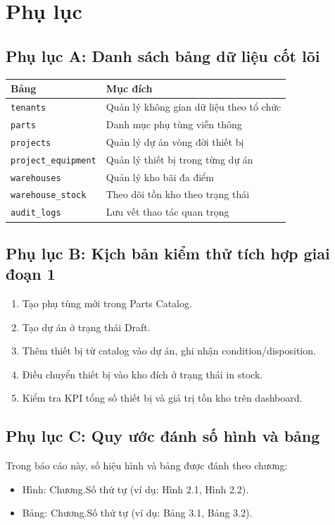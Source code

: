 \chapter{Phụ lục}

\section{Phụ lục A: Danh sách bảng dữ liệu cốt lõi}
\begin{longtable}{p{4.5cm}p{9.5cm}}
\toprule
\textbf{Bảng} & \textbf{Mục đích} \\
\midrule
\texttt{tenants} & Quản lý không gian dữ liệu theo tổ chức \\
\texttt{parts} & Danh mục phụ tùng viễn thông \\
\texttt{projects} & Quản lý dự án vòng đời thiết bị \\
\texttt{project\_equipment} & Quản lý thiết bị trong từng dự án \\
\texttt{warehouses} & Quản lý kho bãi đa điểm \\
\texttt{warehouse\_stock} & Theo dõi tồn kho theo trạng thái \\
\texttt{audit\_logs} & Lưu vết thao tác quan trọng \\
\bottomrule
\end{longtable}

\section{Phụ lục B: Kịch bản kiểm thử tích hợp giai đoạn 1}
\begin{enumerate}[leftmargin=1.2cm]
    \item Tạo phụ tùng mới trong Parts Catalog.
    \item Tạo dự án ở trạng thái Draft.
    \item Thêm thiết bị từ catalog vào dự án, ghi nhận condition/disposition.
    \item Điều chuyển thiết bị vào kho đích ở trạng thái in stock.
    \item Kiểm tra KPI tổng số thiết bị và giá trị tồn kho trên dashboard.
\end{enumerate}

\section{Phụ lục C: Quy ước đánh số hình và bảng}
Trong báo cáo này, số hiệu hình và bảng được đánh theo chương:
\begin{itemize}[leftmargin=1.2cm]
    \item Hình: Chương.Số thứ tự (ví dụ: Hình 2.1, Hình 2.2).
    \item Bảng: Chương.Số thứ tự (ví dụ: Bảng 3.1, Bảng 3.2).
\end{itemize}

